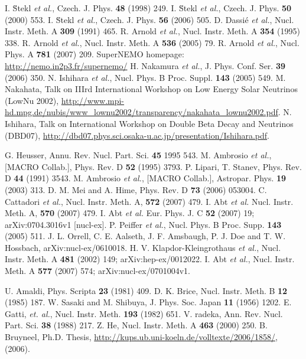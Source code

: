 \begin{thebibliography}{99}
I. \u{S}tekl \textit{et al.}, Czech. J. Phys. \textbf{48} (1998) 249.
I. \u{S}tekl \textit{et al.}, Czech. J. Phys. \textbf{50} (2000) 553.
I. \u{S}tekl \textit{et al.}, Czech. J. Phys. \textbf{56} (2006) 505.
D. Dassi\'{e} \textit{et al.}, Nucl. Instr. Meth. A \textbf{309} (1991) 465.
R. Arnold \textit{et al.}, Nucl. Instr. Meth. A \textbf{354} (1995) 338.
R. Arnold \textit{et al.}, Nucl. Instr. Meth. A \textbf{536} (2005) 79.
R. Arnold \textit{et al.}, Nucl. Phys. A \textbf{781} (2007) 209.
SuperNEMO homepage: \url{http://nemo.in2p3.fr/supernemo/}
H. Nakamura \textit{et al.}, J. Phys. Conf. Ser. \textbf{39} (2006) 350.
N. Ishihara \textit{et al.}, Nucl. Phys. B Proc. Suppl. \textbf{143} (2005) 549.
M. Nakahata, Talk on IIIrd International Workshop on Low Energy Solar Neutrinos (LowNu 2002), \url{http://www.mpi-hd.mpg.de/nubis/www_lownu2002/transparency/nakahata_lownu2002.pdf}. 
N. Ishihara, Talk on International Workshop on Double Beta Decay and Neutrinos (DBD07), \url{http://dbd07.phys.sci.osaka-u.ac.jp/presentation/Ishihara.pdf}.

G. Heusser, Annu. Rev. Nucl. Part. Sci. \textbf{45} 1995 543.
M. Ambrosio \textit{et al.}, [MACRO Collab.], Phys. Rev. D \textbf{52} (1995) 3793.
P. Lipari, T. Stanev, Phys. Rev. D \textbf{44} (1991) 3543.
M. Ambrosio \textit{et al.}, [MACRO Collab.], Astropar. Phys. \textbf{19} (2003) 313.
D. M. Mei and A. Hime, Phys. Rev. D \textbf{73} (2006) 053004.
C. Cattadori \textit{et al.}, Nucl. Instr. Meth. A, \textbf{572} (2007) 479.
I. Abt \textit{et al.} Nucl. Instr. Meth. A, \textbf{570} (2007) 479.
I. Abt \textit{et al.}  Eur. Phys. J. C \textbf{52}   (2007) 19; arXiv:0704.3016v1 [nucl-ex].
P. Peiffer \textit{et al.}, Nucl. Phys. B   Proc. Supp. \textbf{143} (2005) 511.
J. L. Orrell, C. E. Aalseth, J. F. Amsbaugh, P. J. Doe and T. W. Hossbach, arXiv:nucl-ex/0610018.
H. V. Klapdor-Kleingrothaus \textit{et al.},   Nucl. Instr. Meth. A \textbf{481} (2002) 149; arXiv:hep-ex/0012022.
I. Abt \textit{et al.}, Nucl. Instr. Meth. A \textbf{577} (2007) 574; arXiv:nucl-ex/0701004v1.

U. Amaldi, Phys. Scripta \textbf{23} (1981) 409.
D. K. Brice, Nucl. Instr. Meth. B \textbf{12} (1985) 187.
W. Sasaki and M. Shibuya, J. Phys. Soc. Japan \textbf{11} (1956) 1202.
E. Gatti, \textit{et. al.}, Nucl. Instr. Meth. \textbf{193} (1982) 651.
V. radeka, Ann. Rev. Nucl. Part. Sci. \textbf{38} (1988) 217.
Z. He, Nucl. Instr. Meth. A \textbf{463} (2000) 250.
B. Bruyneel, Ph.D. Thesis, \url{http://kups.ub.uni-koeln.de/volltexte/2006/1858/}, (2006).%


\end{thebibliography}
